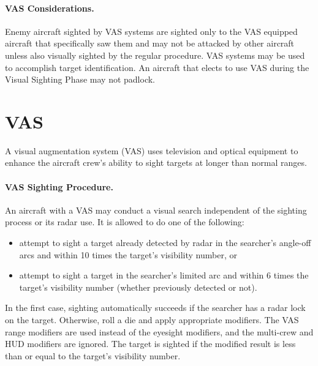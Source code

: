 \begin{advancedrules}
{\paragraph{VAS Considerations.} Enemy aircraft sighted by VAS systems are sighted only to the VAS equipped aircraft that specifically saw them and may not be attacked by other aircraft unless also visually sighted by the regular procedure. VAS systems may be used to accomplish target identification. An aircraft that elects to use VAS during the Visual Sighting Phase may not padlock.

}{

\section{VAS}
\label{rule:vas}

A visual augmentation system (VAS) uses television and optical equipment to enhance the aircraft crew’s ability to sight targets at longer than normal ranges.


\paragraph{VAS Sighting Procedure.} An aircraft with a VAS may conduct a visual search independent of the sighting process or its radar use. It is allowed to do one of the following:

\begin{itemize}

    \item attempt to sight a target already detected by radar in the searcher’s  angle-off arcs and within 10 times the target’s visibility number, or

    \item attempt to sight a target in the searcher’s limited arc and within 6 times the target’s visibility number (whether previously detected or not).

\end{itemize}

In the first case, sighting automatically succeeds if the searcher has a radar lock on the target. Otherwise, roll a die and apply appropriate modifiers. The VAS range modifiers are used instead of the eyesight modifiers, and the multi-crew and HUD modifiers are ignored. The target is sighted if the modified result is less than or equal to the target’s visibility number.

}
\end{advancedrules}
